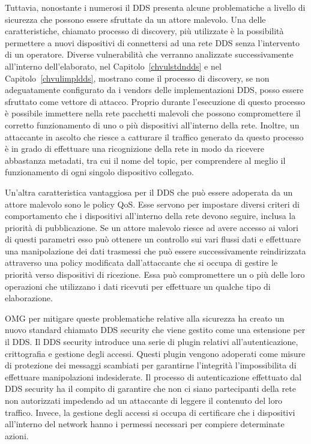 Tuttavia, nonostante i numerosi il DDS presenta alcune 
problematiche a livello di sicurezza che possono 
essere sfruttate da un attore malevolo. Una delle 
caratteristiche, chiamato processo di discovery,
più utilizzate è la possibilità permettere 
a nuovi dispositivi di connettersi ad una rete DDS senza 
l'intervento di un operatore. Diverse vulnerabilità che verranno 
analizzate successivamente all'interno dell'elaborato, nel 
Capitolo~\ref{chvulstdndds} e nel Capitolo~\ref{chvulimpldds}, 
mostrano come il processo di discovery, se non adeguatamente 
configurato da i vendors delle implementazioni DDS, posso 
essere sfruttato come vettore di attacco. Proprio durante 
l'esecuzione di questo processo è possibile immettere nella 
rete pacchetti malevoli che possono compromettere il 
corretto funzionamento di uno o più dispositivi all'interno 
della rete. Inoltre, un attaccante in ascolto 
che riesce a catturare 
il traffico generato da questo processo è in grado 
di effettuare una ricognizione della rete in modo da 
ricevere abbastanza metadati, tra cui il nome del topic,
per comprendere al meglio 
il funzionamento di ogni singolo dispositivo collegato.

Un'altra caratteristica vantaggiosa per il DDS che può 
essere adoperata da un attore malevolo sono le policy QoS.
Esse servono per impostare diversi criteri di
comportamento che i dispositivi all'interno della rete 
devono seguire, inclusa la priorità di pubblicazione.
Se un attore malevolo riesce ad avere accesso ai valori 
di questi parametri esso può ottenere un controllo sui 
vari flussi dati e effettuare una manipolazione 
dei dati trasmessi che può essere 
successivamente reindirizzata attraverso una policy modificata 
dall'attaccante che 
si occupa di gestire le 
priorità verso dispositivi di ricezione. Essa può compromettere
un o più delle loro operazioni che utilizzano 
i dati ricevuti per effettuare un qualche tipo di elaborazione.

OMG per mitigare queste problematiche relative alla sicurezza 
ha creato un nuovo standard chiamato DDS security che viene
gestito come una estensione per il DDS. Il DDS security introduce 
una serie di plugin relativi all'autenticazione, crittografia e 
gestione degli accessi. Questi plugin vengono adoperati come misure 
di protezione dei messaggi scambiati per garantirne l'integrità 
l'impossibilita di effettuare manipolazioni indesiderate. 
Il processo di autenticazione effettuato dal DDS security 
ha il compito di garantire che non ci siano partecipanti della 
rete non autorizzati impedendo ad un attaccante di leggere 
il contenuto del loro traffico. Invece, la gestione degli accessi
si occupa di certificare che i dispositivi all'interno del network
hanno i permessi necessari per compiere determinate azioni.

